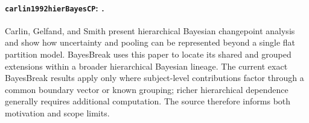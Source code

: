 
\paragraph{\texttt{carlin1992hierBayesCP}: \citet{carlin1992hierBayesCP}.}
Carlin, Gelfand, and Smith present hierarchical Bayesian changepoint analysis and show how uncertainty and pooling can be represented beyond a single flat partition model. BayesBreak uses this paper to locate its shared and grouped extensions within a broader hierarchical Bayesian lineage. The current exact BayesBreak results apply only where subject-level contributions factor through a common boundary vector or known grouping; richer hierarchical dependence generally requires additional computation. The source therefore informs both motivation and scope limits.
